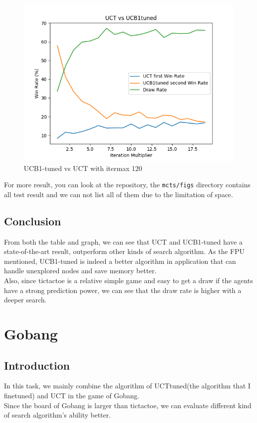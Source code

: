 \documentclass[11pt]{article}
\theoremstyle{definitionstyle}
\begin{document}
\begin{figure}[H]
\begin{minipage}{0.32\textwidth}
        \includegraphics[width=\textwidth]{mcts/figs/120/UCT vs UCB1tuned1.png}
        \caption{UCB1-tuned vs UCT with itermax 120}
        \label{fig:1202}
    \end{minipage}
\end{figure}
For more result, you can look at the repository, the \texttt{mcts/figs} directory contains all test result and we can not list all of them due to the limitation of space.
\subsection{Conclusion}
From both the table and graph, we can see that UCT and UCB1-tuned have a state-of-the-art result, outperform other kinds of search algorithm. As the FPU mentioned, UCB1-tuned is indeed a better algorithm in application that can handle unexplored nodes and save memory better.\\
Also, since tictactoe is a relative simple game and easy to get a draw if the agents have a strong prediction power, we can see that the draw rate is higher with a deeper search.
\section{Gobang}
\subsection{Introduction}
In this task, we mainly combine the algorithm of UCTtuned(the algorithm that I finetuned) and UCT in the game of Gobang.\\
Since the board of Gobang is larger than tictactoe, we can evaluate different kind of search algorithm's ability better.
\end{document}
